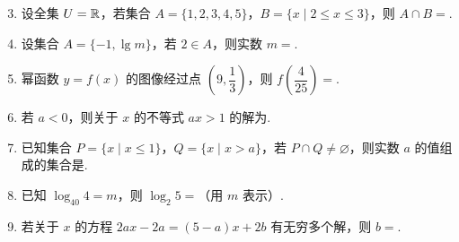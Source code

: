 \documentclass[a4paper,11pt]{article}
\begin{document}


\begin{enumerate}
\setcounter{enumi}{2}

\item 设全集 $U=\mathbb{R}$，若集合 $A=\{1,2,3,4,5\}$，$B=\{x\mid 2\leqslant x\leqslant3\}$，则 $A\cap B=$\blankline[4.4em].

\ifanswer
{}
\fi

\item 设集合 $A=\{-1,\lg m\}$，若 $2\in A$，则实数 $m=$\blankline[4.4em].

\ifanswer
\solbegin
{}
\solend
\fi

\item 幂函数 $y=f(x)$ 的图像经过点 $\left(9,\dfrac13\right)$，则 $f\left(\dfrac4{25}\right)=$\blankline[4.4em].

\ifanswer
\solbegin
{}
\solend
\fi

\item 若 $a<0$，则关于 $x$ 的不等式 $ax>1$ 的解为\blankline[4.4em].

\ifanswer
\solbegin
{}
\solend
\fi

\item 已知集合 $P=\{x\mid x\leqslant1\}$，$Q=\{x\mid x>a\}$，若 $P\cap Q\ne\varnothing$，则实数 $a$ 的值组成的集合是\blankline[4.4em].

\ifanswer
\solbegin
{}
\solend
\fi

\item 已知 $\log_{40}4=m$，则 $\log_2 5=$\blankline[4.4em]（用 $m$ 表示）.

\ifanswer
\solbegin
{}
\solend
\fi

\item 若关于 $x$ 的方程 $2ax-2a=(5-a)x+2b$ 有无穷多个解，则 $b=$\blankline[4.4em].


\end{enumerate}
\end{document}
